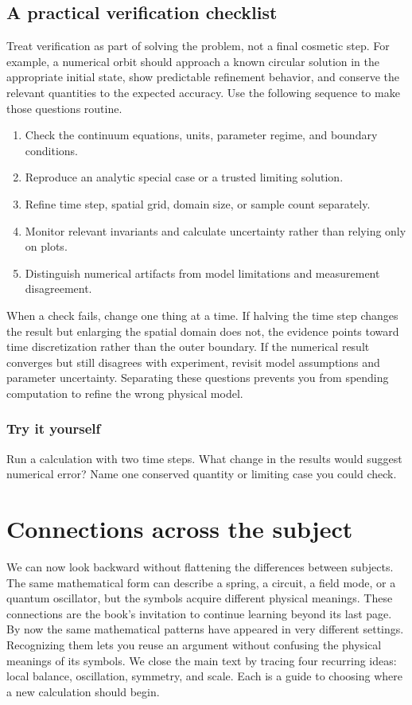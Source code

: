 \documentclass[11pt,oneside]{book}
\theoremstyle{reviewstyle}
\newcommand{\learningcheck}[1]{\subsection*{Try it yourself}\noindent #1\par}
\begin{document}
\section{A practical verification checklist}
Treat verification as part of solving the problem, not a final cosmetic step. For example, a numerical orbit should approach a known circular solution in the appropriate initial state, show predictable refinement behavior, and conserve the relevant quantities to the expected accuracy. Use the following sequence to make those questions routine.

\begin{enumerate}
\item Check the continuum equations, units, parameter regime, and boundary conditions.
\item Reproduce an analytic special case or a trusted limiting solution.
\item Refine time step, spatial grid, domain size, or sample count separately.
\item Monitor relevant invariants and calculate uncertainty rather than relying only on plots.
\item Distinguish numerical artifacts from model limitations and measurement disagreement.
\end{enumerate}

When a check fails, change one thing at a time. If halving the time step changes the result but enlarging the spatial domain does not, the evidence points toward time discretization rather than the outer boundary. If the numerical result converges but still disagrees with experiment, revisit model assumptions and parameter uncertainty. Separating these questions prevents you from spending computation to refine the wrong physical model.

\learningcheck{Run a calculation with two time steps. What change in the results would suggest numerical error? Name one conserved quantity or limiting case you could check.}

\chapter{Connections across the subject}
We can now look backward without flattening the differences between subjects. The same mathematical form can describe a spring, a circuit, a field mode, or a quantum oscillator, but the symbols acquire different physical meanings. These connections are the book's invitation to continue learning beyond its last page.
By now the same mathematical patterns have appeared in very different settings. Recognizing them lets you reuse an argument without confusing the physical meanings of its symbols. We close the main text by tracing four recurring ideas: local balance, oscillation, symmetry, and scale. Each is a guide to choosing where a new calculation should begin.
\end{document}
